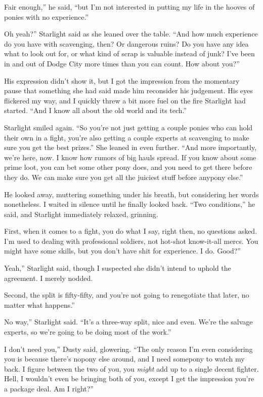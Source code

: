 \leavevmode{}Fair enough,” he said, “but I’m not interested in putting my life in the hooves of ponies with no experience.”

\leavevmode{}Oh yeah?” Starlight said as she leaned over the table. “And how much experience do you have with scavenging, then? Or dangerous ruins? Do you have any idea what to look out for, or what kind of scrap is valuable instead of junk? I’ve been in and out of Dodge City more times than you can count. How about you?”

His expression didn’t show it, but I got the impression from the momentary pause that something she had said made him reconsider his judgement. His eyes flickered my way, and I quickly threw a bit more fuel on the fire Starlight had started. “And I know all about the old world and its tech.”

Starlight smiled again. “So you’re not just getting a couple ponies who can hold their own in a fight, you’re also getting a couple experts at scavenging to make sure you get the best prizes.” She leaned in even further. “And more importantly, we’re here, now. I know how rumors of big hauls spread. If you know about some prime loot, you can bet some other pony does, and you need to get there before they do. We can make sure you get all the juiciest stuff before anypony else.”

He looked away, muttering something under his breath, but considering her words nonetheless. I waited in silence until he finally looked back. “Two conditions,” he said, and Starlight immediately relaxed, grinning.

\leavevmode{}First, when it comes to a fight, you do what I say, right then, no questions asked. I’m used to dealing with professional soldiers, not hot-shot know-it-all mercs. You might have some skills, but you don’t have shit for experience. I do. Good?”

\leavevmode{}Yeah,” Starlight said, though I suspected she didn’t intend to uphold the agreement. I merely nodded.

\leavevmode{}Second, the split is fifty-fifty, and you’re not going to renegotiate that later, no matter what happens.”

\leavevmode{}No way,” Starlight said. “It’s a three-way split, nice and even. We’re the salvage experts, so we’re going to be doing most of the work.”

\leavevmode{}I don’t need you,” Dusty said, glowering. “The only reason I’m even considering you is because there’s nopony else around, and I need somepony to watch my back. I figure between the two of you, you \textit{might} add up to a single decent fighter. Hell, I wouldn’t even be bringing both of you, except I get the impression you’re a package deal. Am I right?”

